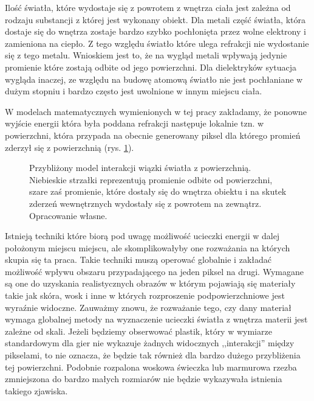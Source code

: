 \documentclass[../main.tex]{subfiles}
\begin{document}
Ilość światła, które wydostaje się z powrotem z wnętrza ciała jest zależna od rodzaju substancji z której jest wykonany obiekt. Dla metali część światła, która dostaje się do wnętrza zostaje bardzo szybko pochłonięta przez wolne elektrony i zamieniona na ciepło. Z tego względu światło które ulega refrakcji nie wydostanie się z tego metalu. Wnioskiem jest to, że na wygląd metali wpływają jedynie promienie które zostają odbite od jego powierzchni. Dla dielektryków sytuacja wygląda inaczej, ze względu na budowę atomową światło nie jest pochłaniane w dużym stopniu i bardzo często jest uwolnione w innym miejscu ciała.

W modelach matematycznych wymienionych w tej pracy zakładamy, że ponowne wyjście energii która była poddana refrakcji następuje lokalnie tzn. w powierzchni, która przypada na obecnie generowany piksel dla którego promień zderzył się z powierzchnią (rys. \ref{fig:ReflectionRefraction}).

\begin{figure}[h]
  \centering
  \caption{Przybliżony model interakcji wiązki światła z powierzchnią. Niebieskie strzałki reprezentują promienie odbite od powierzchni, szare zaś promienie, które dostały się do wnętrza obiektu i na skutek zderzeń wewnętrznych wydostały się z powrotem na zewnątrz. Opracowanie własne.}
  \label{fig:ReflectionRefraction}
\end{figure}

Istnieją techniki które biorą pod uwagę możliwość ucieczki energii w dalej położonym miejscu miejscu, ale skomplikowałyby one rozważania na których skupia się ta praca. Takie techniki muszą operować globalnie i zakładać możliwość wpływu obszaru przypadającego na jeden piksel na drugi. Wymagane są one do uzyskania realistycznych obrazów w którym pojawiają się materiały takie jak skóra, wosk i inne w których rozproszenie podpowierzchniowe jest wyraźnie widoczne. Zauważmy znowu, że rozważanie tego, czy dany materiał wymaga globalnej metody na wyznaczenie ucieczki światła z wnętrza materii jest zależne od skali. Jeżeli będziemy obserwować plastik, który w wymiarze standardowym dla gier nie wykazuje żadnych widocznych ,,interakcji'' między pikselami, to nie oznacza, że będzie tak również dla bardzo dużego przybliżenia tej powierzchni. Podobnie rozpalona woskowa świeczka lub marmurowa rzezba zmniejszona do bardzo małych rozmiarów nie będzie wykazywała istnienia takiego zjawiska.
\end{document}
